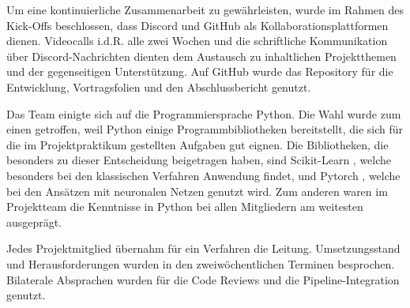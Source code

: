 Um eine kontinuierliche Zusammenarbeit zu gewährleisten, wurde im Rahmen des Kick-Offs beschlossen, dass Discord
und GitHub
als Kollaborationsplattformen dienen. Videocalls i.d.R. alle zwei Wochen und die schriftliche Kommunikation über Discord-Nachrichten dienten dem Austausch zu inhaltlichen Projektthemen und der gegenseitigen Unterstützung. Auf GitHub wurde das Repository \cite{Suxdorf2025Quality} für die Entwicklung, Vortragsfolien und den Abschlussbericht genutzt. %

\label{Programmiersprache}
Das Team einigte sich auf die Programmiersprache Python.
Die Wahl wurde zum einen getroffen, weil Python einige Programmbibliotheken bereitstellt, die sich für die im Projektpraktikum gestellten Aufgaben gut eignen. Die Bibliotheken, die besonders zu dieser Entscheidung beigetragen haben, sind Scikit-Learn \cite{Pedregosa2011}, welche besonders bei den klassischen Verfahren Anwendung findet, und Pytorch \cite{Ansel2024}, welche bei den Ansätzen mit neuronalen Netzen genutzt wird. Zum anderen waren im Projektteam die Kenntnisse in Python bei allen Mitgliedern am weitesten ausgeprägt.

Jedes Projektmitglied übernahm für ein Verfahren die Leitung. Umsetzungsstand und Herausforderungen wurden in den zweiwöchentlichen Terminen besprochen. Bilaterale Absprachen wurden für die Code Reviews und die Pipeline-Integration genutzt.
